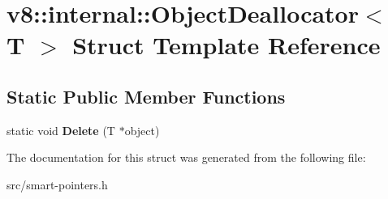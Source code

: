 \hypertarget{structv8_1_1internal_1_1_object_deallocator}{}\section{v8\+:\+:internal\+:\+:Object\+Deallocator$<$ T $>$ Struct Template Reference}
\label{structv8_1_1internal_1_1_object_deallocator}
\subsection*{Static Public Member Functions}
\begin{DoxyCompactItemize}
\item 
\hypertarget{structv8_1_1internal_1_1_object_deallocator_a75d64a008bc3ed5b7738f7d841011c1e}{}static void {\bfseries Delete} (T $\ast$object)\label{structv8_1_1internal_1_1_object_deallocator_a75d64a008bc3ed5b7738f7d841011c1e}

\end{DoxyCompactItemize}


The documentation for this struct was generated from the following file\+:\begin{DoxyCompactItemize}
\item 
src/smart-\/pointers.\+h\end{DoxyCompactItemize}
